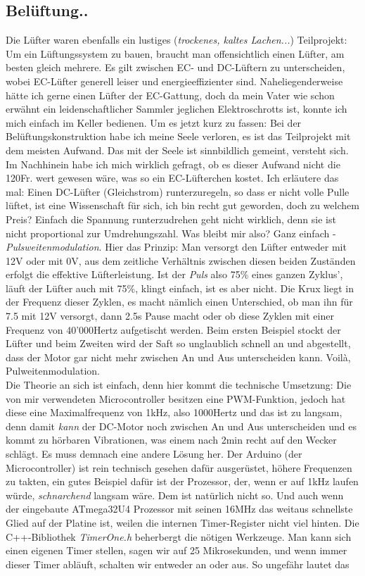 \documentclass[12pt,titlepage,a4paper]{article}
\begin{document}
\subsection{Belüftung..}
Die Lüfter waren ebenfalls ein lustiges (\textit{trockenes, kaltes Lachen...}) Teilprojekt: \\Um ein Lüftungssystem zu bauen, braucht man offensichtlich einen Lüfter, am besten gleich mehrere. Es gilt zwischen EC- und DC-Lüftern zu unterscheiden, wobei EC-Lüfter generell leiser und energieeffizienter sind. Naheliegenderweise hätte ich gerne einen Lüfter der EC-Gattung, doch da mein Vater wie schon erwähnt ein leidenschaftlicher Sammler jeglichen Elektroschrotts ist, konnte ich mich einfach im Keller bedienen. Um es jetzt kurz zu fassen: Bei der Belüftungskonstruktion habe ich meine Seele verloren, es ist das Teilprojekt mit dem meisten Aufwand. Das mit der Seele ist sinnbildlich gemeint, versteht sich. Im Nachhinein habe ich mich wirklich gefragt, ob es dieser Aufwand nicht die 120Fr. wert gewesen wäre, was so ein EC-Lüfterchen kostet. Ich erläutere das mal: Einen DC-Lüfter (Gleichstrom) runterzuregeln, so dass er nicht volle Pulle lüftet, ist eine Wissenschaft für sich, ich bin recht gut geworden, doch zu welchem Preis? Einfach die Spannung runterzudrehen geht nicht wirklich, denn sie ist nicht proportional zur Umdrehungszahl. Was bleibt mir also? Ganz einfach - \textit{Pulsweitenmodulation}. Hier das Prinzip: Man versorgt den Lüfter entweder mit 12V oder mit 0V, aus dem zeitliche Verhältnis zwischen diesen beiden Zuständen erfolgt die effektive Lüfterleistung. Ist der \textit{Puls} also 75\% eines ganzen Zyklus', läuft der Lüfter auch mit 75\%, klingt einfach, ist es aber nicht. Die Krux liegt in der Frequenz dieser Zyklen, es macht nämlich einen Unterschied, ob man ihn für 7.5 mit 12V versorgt, dann 2.5s Pause macht oder ob diese Zyklen mit einer Frequenz von 40'000Hertz aufgetischt werden. Beim ersten Beispiel stockt der Lüfter und beim Zweiten wird der Saft so unglaublich schnell an und abgestellt, dass der Motor gar nicht mehr zwischen An und Aus unterscheiden kann. Voilà, Pulweitenmodulation. \\ Die Theorie an sich ist einfach, denn hier kommt die technische Umsetzung: Die von mir verwendeten Microcontroller besitzen eine PWM-Funktion, jedoch hat diese eine Maximalfrequenz von 1kHz, also 1000Hertz und das ist zu langsam, denn damit \textit{kann} der DC-Motor noch zwischen An und Aus unterscheiden und es kommt zu hörbaren Vibrationen, was einem nach 2min recht auf den Wecker schlägt. Es muss demnach eine andere Lösung her. Der Arduino (der Microcontroller) ist rein technisch gesehen dafür ausgerüstet, höhere Frequenzen zu takten, ein gutes Beispiel dafür ist der Prozessor, der, wenn er auf 1kHz laufen würde, \textit{schnarchend} langsam wäre. Dem ist natürlich nicht so. Und auch wenn der eingebaute ATmega32U4 Prozessor mit seinen 16MHz das weitaus schnellste Glied auf der Platine ist, weilen die internen Timer-Register nicht viel hinten. Die C++-Bibliothek \textit{TimerOne.h} beherbergt die nötigen Werkzeuge. Man kann sich einen eigenen Timer stellen, sagen wir auf 25 Mikrosekunden, und wenn immer dieser Timer abläuft, schalten wir entweder an oder aus. So ungefähr lautet das 
\end{document}
